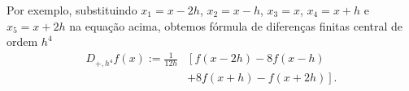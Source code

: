 Por exemplo, substituindo $x_1=x-2h$, $x_2=x-h$, $x_3=x$, $x_4=x+h$ e $x_5=x+2h$ na equação acima, obtemos fórmula de diferenças finitas central de ordem $h^4$
\begin{align}
  D_{+,h^4}f(x) := \frac{1}{12h} &\left[f{\left (x - 2 h\right )} - 8 f{\left(x - h \right )} \right. \\
  &+ \left. 8 f{\left (x + h \right )} - f{\left (x + 2 h \right )}\right].
\end{align}

\emconstrucao